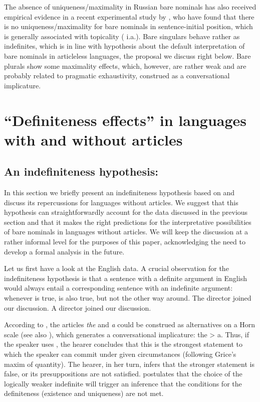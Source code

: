 \documentclass[output=paper,
colorlinks,
citecolor=brown,
newtxmath
]{langscibook}
\begin{document}
\noindent The absence of uniqueness/maximality in Russian bare nominals has also received empirical evidence in a recent experimental study by \citet{Simik.Demian2020}, who have found that there is no uniqueness/maximality for bare nominals in sentence-initial position, which is generally associated with topicality (\citealt{Geist2010} i.a.). Bare singulars behave rather as indefinites, which is in line with  hypothesis about the default interpretation of bare nominals in articleless languages, the proposal we discuss right below. Bare plurals show some maximality effects, which, however, are rather weak and are probably related to pragmatic exhaustivity, construed as a conversational implicature.

\section{``Definiteness effects'' in languages with and without articles}
\label{sec:definiteness-effects}
\subsection{An indefiniteness hypothesis: \citet{Heim2011}}
In this section we briefly present an indefiniteness hypothesis based on \citet{Heim2011} and discuss its repercussions for languages without articles. We suggest that this hypothesis can straightforwardly account for the data discussed in the previous section and that it makes the right predictions for the interpretative possibilities of bare nominals in languages without articles. We will keep the discussion at a rather informal level for the purposes of this paper, acknowledging the need to develop a formal analysis in the future.

Let us
first have a look at the English data.
A crucial observation for the indefiniteness hypothesis is that a sentence with a definite argument in English would always entail a corresponding sentence with an indefinite argument: whenever  is true,  is also true, but not the other way around.
\ea
\ea \label{ex:27a}
The director joined our discussion.
\ex \label{ex:27b}
A director joined our discussion.
\z \z

\noindent According to \citet{Heim2011}, the articles \textit{the} and \textit{a} could be construed as alternatives on a Horn scale (see also \citealt{Hawkins1978}), %
which generates a conversational implicature: the > a. Thus, if the speaker uses , the hearer concludes that this is the strongest statement to which the speaker can commit under given circumstances (following Grice's maxim of quantity). The hearer, in her turn, infers that the stronger statement is false, or its presuppositions are not satisfied. \citet{Heim2011} postulates that the choice of the logically weaker indefinite will trigger an inference that the conditions for the definiteness (existence and uniqueness) are not met.
\end{document}
